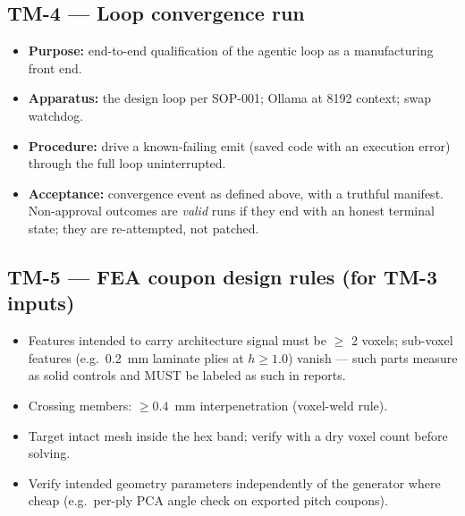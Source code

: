 \documentclass[11pt]{article}
\begin{document}
\subsection*{TM-4 --- Loop convergence run}
\begin{itemize}[nosep]
  \item \textbf{Purpose:} end-to-end qualification of the agentic loop as a manufacturing front end.
  \item \textbf{Apparatus:} the design loop per SOP-001; Ollama at 8192 context; swap watchdog.
  \item \textbf{Procedure:} drive a known-failing emit (saved code with an execution error) through
    the full loop uninterrupted.
  \item \textbf{Acceptance:} convergence event as defined above, with a truthful manifest.
    Non-approval outcomes are \emph{valid} runs if they end with an honest terminal state; they are
    re-attempted, not patched.
\end{itemize}

\subsection*{TM-5 --- FEA coupon design rules (for TM-3 inputs)}
\begin{itemize}[nosep]
  \item Features intended to carry architecture signal must be $\ge$ 2 voxels; sub-voxel
    features (e.g.\ 0.2~mm laminate plies at $h \ge 1.0$) vanish --- such parts measure as
    solid controls and MUST be labeled as such in reports.
  \item Crossing members: $\ge 0.4$~mm interpenetration (voxel-weld rule).
  \item Target intact mesh inside the hex band; verify with a dry voxel count before solving.
  \item Verify intended geometry parameters independently of the generator where cheap
    (e.g.\ per-ply PCA angle check on exported pitch coupons).
\end{itemize}
\end{document}
